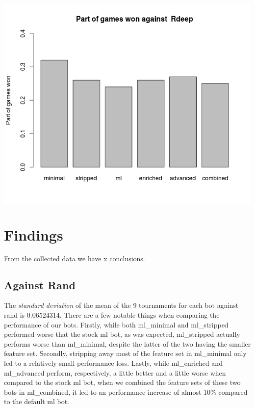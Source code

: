 \documentclass[a4paper,11pt]{article}
\begin{document}
\begin{center}
\begin{minipage}{0.49\linewidth}
\end{minipage}
      \\ %
\begin{minipage}{0.49\linewidth}
\includegraphics[width=\linewidth]{images/barplotRdeep.png}
\end{minipage}
\end{center}

\section{Findings}
From the collected data we have x conclusions. 


\subsection*{Against Rand}
The \textit{standard deviation} of the mean of the 9 tournaments for each bot against rand is 0.06524314. 
There are a few notable things when comparing the performance of our bots. Firstly, while both ml\_minimal and ml\_stripped performed worse that the stock ml bot, as was expected, ml\_stripped actually performs worse than ml\_minimal, despite the latter of the two having the smaller feature set. Secondly, stripping away most of the feature set in ml\_minimal only led to a relatively small performance loss. Lastly, while ml\_enriched and ml\_advanced perform, respectively, a little better and a little worse when compared to the stock ml bot, when we combined the feature sets of these two bots in ml\_combined, it led to an performance increase of almost 10\% compared to the default ml bot.  
\end{document}
